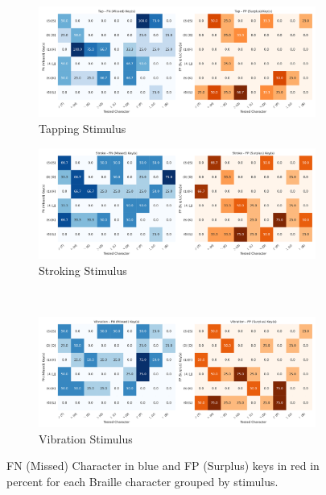 \begin{figure}[h!]
    \centering
    \begin{subfigure}[b]{0.45\textwidth}
        \centering
        \includegraphics[width=\textwidth]{src/pictures/Study1Data_Experiment/missed_surplus_test_percentages_study1_T.pdf}
        \caption{Tapping Stimulus}
    \end{subfigure}
    \begin{subfigure}[b]{0.45\textwidth}
        \centering
        \includegraphics[width=\textwidth]{src/pictures/Study1Data_Experiment/missed_surplus_test_percentages_study1_S.pdf}
        \caption{Stroking Stimulus}
    \end{subfigure}\\
    \begin{subfigure}[b]{0.45\textwidth}
        \centering
        \includegraphics[width=\textwidth]{src/pictures/Study1Data_Experiment/missed_surplus_test_percentages_study1_V.pdf}
        \caption{Vibration Stimulus}
    \end{subfigure}
    \caption{FN (Missed) Character in blue and FP (Surplus) keys in red in percent for each Braille character grouped by stimulus.}
    \label{fig:missed_surplus_percentages_study1}
\end{figure}

